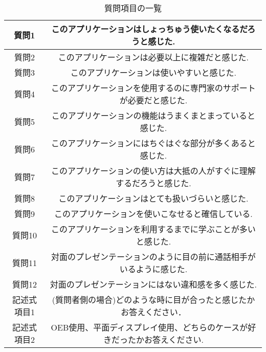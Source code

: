 \begin{table}[tp]
  \begin{center}
  \begin{tabular}{|c|c|}
  \hline
  質問1   & このアプリケーションはしょっちゅう使いたくなるだろうと感じた.     \\ \hline
  質問2   & このアプリケーションは必要以上に複雑だと感じた.            \\ \hline
  質問3   & このアプリケーションは使いやすいと感じた.               \\ \hline
  質問4   & このアプリケーションを使用するのに専門家のサポートが必要だと感じた.  \\ \hline
  質問5   & このアプリケーションの機能はうまくまとまっていると感じた.       \\ \hline
  質問6   & このアプリケーションにはちぐはぐな部分が多くあると感じた.       \\ \hline
  質問7   & このアプリケーションの使い方は大抵の人がすぐに理解するだろうと感じた. \\ \hline
  質問8   & このアプリケーションはとても扱いづらいと感じた.            \\ \hline
  質問9   & このアプリケーションを使いこなせると確信している.           \\ \hline
  質問10  & このアプリケーションを利用するまでに学ぶことが多いと感じた.      \\ \hline
  質問11  & 対面のプレゼンテーションのように目の前に通話相手がいるように感じた.  \\ \hline
  質問12  & 対面のプレゼンテーションにはない違和感を多く感じた.          \\ \hline
  記述式項目1 & (質問者側の場合)どのような時に目が合ったと感じたかお答えください．  \\ \hline
  記述式項目2 & OEB使用、平面ディスプレイ使用、どちらのケースが好きだったかお答えください. \\ \hline
  \end{tabular}
  \caption{質問項目の一覧}
  \end{center}
  \end{table}